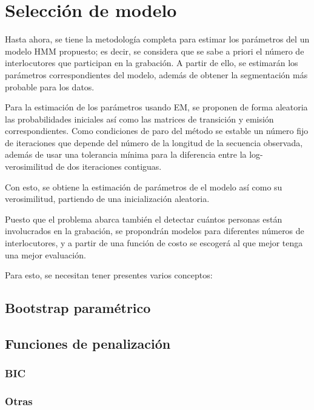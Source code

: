 
\chapter{Selección de modelo}


Hasta ahora, se tiene la metodología completa para estimar los parámetros del un modelo HMM propuesto; es decir, se considera que se sabe a priori el número de interlocutores que participan en la grabación. A partir de ello, se estimarán los parámetros correspondientes del modelo, además de obtener la segmentación más probable para los datos.

Para la estimación de los parámetros usando EM, se proponen de forma aleatoria las probabilidades iniciales así como las matrices de transición y emisión correspondientes. Como condiciones de paro del método se estable un número fijo de iteraciones que depende del número de la longitud de la secuencia observada, además de usar una tolerancia mínima para la diferencia entre la log-verosimilitud de dos iteraciones contiguas. 

Con esto, se obtiene la estimación de parámetros de el modelo así como su verosimilitud, partiendo de una inicialización aleatoria.

Puesto que el problema abarca también el detectar cuántos personas están involucrados en la grabación, se propondrán modelos para diferentes números de interlocutores, y a partir de una función de costo se escogerá al que mejor tenga una mejor evaluación.

Para esto, se necesitan tener presentes varios conceptos: 

\section{Bootstrap paramétrico}

\section{Funciones de penalización}

\subsection{BIC}
\subsection{Otras}



